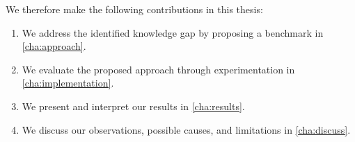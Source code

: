 We therefore make the following contributions in this thesis:
\begin{enumerate}
	\item We address the identified knowledge gap by proposing a benchmark in \cref{cha:approach}.
	\item We evaluate the proposed approach through experimentation in \cref{cha:implementation}.
	\item We present and interpret our results in \cref{cha:results}.
	\item We discuss our observations, possible causes, and limitations in \cref{cha:discuss}.
\end{enumerate}
